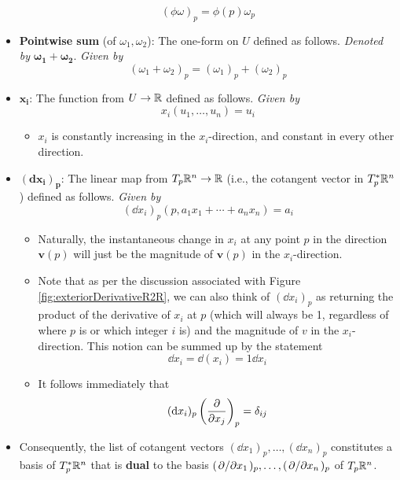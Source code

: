 \documentclass[../notes.tex]{subfiles}
\begin{document}
\begin{itemize}
\begin{equation*}
        (\phi\omega)_p = \phi(p)\omega_p
    \end{equation*}
    \item \textbf{Pointwise sum} (of $\omega_1,\omega_2$): The one-form on $U$ defined as follows. \emph{Denoted by} $\bm{\omega_1+\omega_2}$. \emph{Given by}
    \begin{equation*}
        (\omega_1+\omega_2)_p = (\omega_1)_p+(\omega_2)_p
    \end{equation*}
    \item $\bm{x_i}$: The function from $U\to\mathbb{R}$ defined as follows. \emph{Given by}
    \begin{equation*}
        x_i(u_1,\dots,u_n) = u_i
    \end{equation*}
    \begin{itemize}
        \item $x_i$ is constantly increasing in the $x_i$-direction, and constant in every other direction.
    \end{itemize}
    \item $\bm{(\mathbf{d}x_i)_p}$: The linear map from $T_p\mathbb{R}^n\to\mathbb{R}$ (i.e., the cotangent vector in $T_p^*\mathbb{R}^n$) defined as follows. \emph{Given by}
    \begin{equation*}
        (\dd x_i)_p(p,a_1x_1+\cdots+a_nx_n) = a_i
    \end{equation*}
    \begin{itemize}
        \item Naturally, the instantaneous change in $x_i$ at any point $p$ in the direction $\bm{v}(p)$ will just be the magnitude of $\bm{v}(p)$ in the $x_i$-direction.
        \item Note that as per the discussion associated with Figure \ref{fig:exteriorDerivativeR2R}, we can also think of $(\dd{x_i})_p$ as returning the product of the derivative of $x_i$ at $p$ (which will always be 1, regardless of where $p$ is or which integer $i$ is) and the magnitude of $v$ in the $x_i$-direction. This notion can be summed up by the statement
        \begin{equation*}
            \dd{x_i} = \dd(x_i) = 1\dd{x_i}
        \end{equation*}
        \item It follows immediately that
        \begin{equation*}
            (\dd x_i)_p\left( \pdv{x_j} \right)_p = \delta_{ij}
        \end{equation*}
    \end{itemize}
    \item Consequently, the list of cotangent vectors $(\dd x_1)_p,\dots,(\dd x_n)_p$ constitutes a basis of $T_p^*\mathbb{R}^n$ that is \textbf{dual} to the basis $(\pdv*{x_1})_p,\dots,(\pdv*{x_n})_p$ of $T_p\mathbb{R}^n$.

\end{itemize}
\end{document}
